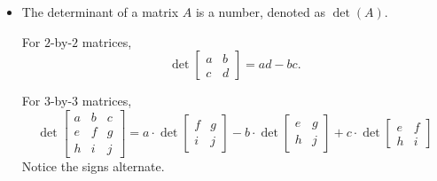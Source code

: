 \documentclass[../main.tex]{subfiles}
\begin{document}
\begin{itemize}
    \[
      \lambda 
      \begin{bmatrix}
        a & b \\ 
        c & d
      \end{bmatrix}
      = 
      \begin{bmatrix}
        \lambda a & \lambda b \\ 
        \lambda c & \lambda d
      \end{bmatrix}
      \qquad\text{and}\qquad
      \lambda 
      \begin{bmatrix}
        a & b & c \\
        d & e & f \\
        g & h & i
      \end{bmatrix}
      = 
      \begin{bmatrix}
        \lambda a & \lambda b & \lambda c \\
        \lambda d & \lambda e & \lambda f \\
        \lambda g & \lambda h & \lambda i
      \end{bmatrix}
    \]

  \item The determinant of a matrix \(A\) is a number, denoted as \(\det(A)\).

    For \(2\)-by-\(2\) matrices,
    \[
      \det 
      \begin{bmatrix}
        a & b \\
        c & d
      \end{bmatrix} 
      =
      ad - bc.
    \]

    For \(3\)-by-\(3\) matrices,
    \[
      \det 
      \begin{bmatrix}
        a & b & c \\
        e & f & g \\
        h & i & j
      \end{bmatrix} 
      =
      a \cdot \det 
      \begin{bmatrix}
        f & g \\
        i & j
      \end{bmatrix} 
      -
      b \cdot \det 
      \begin{bmatrix}
        e & g \\
        h & j
      \end{bmatrix} 
      +
      c \cdot \det 
      \begin{bmatrix}
        e & f \\
        h & i
      \end{bmatrix} 
    \]
    Notice the signs alternate.


\end{itemize}
\end{document}
